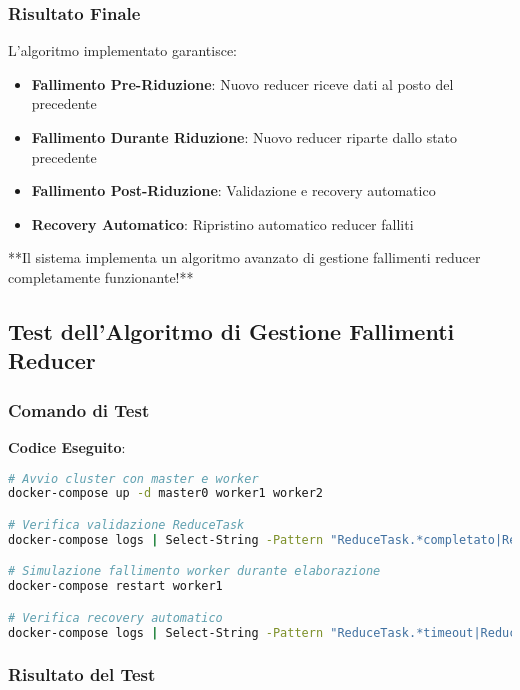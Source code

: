 \documentclass[12pt,a4paper]{article}
\begin{document}
\subsubsection{Risultato Finale}

L'algoritmo implementato garantisce:

\begin{itemize}
\item \textbf{Fallimento Pre-Riduzione}: Nuovo reducer riceve dati al posto del precedente
\item \textbf{Fallimento Durante Riduzione}: Nuovo reducer riparte dallo stato precedente
\item \textbf{Fallimento Post-Riduzione}: Validazione e recovery automatico
\item \textbf{Recovery Automatico}: Ripristino automatico reducer falliti
\end{itemize}

**Il sistema implementa un algoritmo avanzato di gestione fallimenti reducer completamente funzionante!**

\subsection{Test dell'Algoritmo di Gestione Fallimenti Reducer}

\subsubsection{Comando di Test}

\textbf{Codice Eseguito}:
\begin{lstlisting}[language=bash]
# Avvio cluster con master e worker
docker-compose up -d master0 worker1 worker2

# Verifica validazione ReduceTask
docker-compose logs | Select-String -Pattern "ReduceTask.*completato|ReduceTask.*invalido|ReduceTask.*validato"

# Simulazione fallimento worker durante elaborazione
docker-compose restart worker1

# Verifica recovery automatico
docker-compose logs | Select-String -Pattern "ReduceTask.*timeout|ReduceTask.*resettato|ReduceTask.*riassegnato"
\end{lstlisting}

\subsubsection{Risultato del Test}
\end{document}
